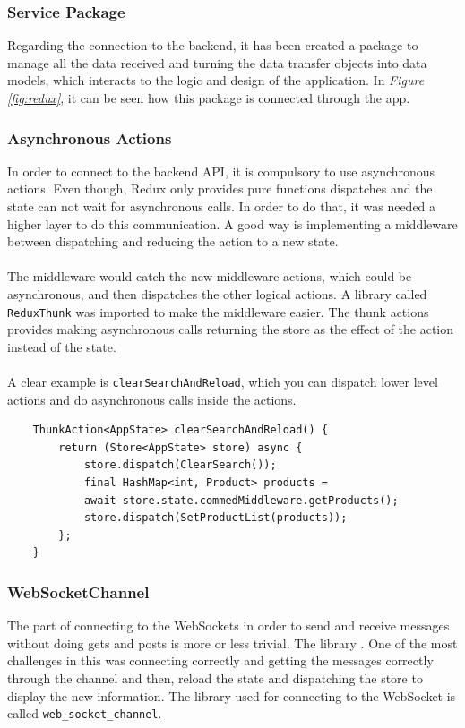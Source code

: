 \documentclass[./main.tex]{subfiles}
\begin{document}
	\subsubsection{Service Package}
	Regarding the connection to the backend, it has been created a package to manage all the data received and turning the data transfer objects into data models, which interacts to the logic and design of the application. In \textit{Figure \ref{fig:redux}}, it can be seen how this package is connected through the app.
	\subsubsection{Asynchronous Actions}
	In order to connect to the backend API, it is compulsory to use asynchronous actions. Even though, Redux only provides pure functions dispatches and the state can not wait for asynchronous calls. In order to do that, it was needed a higher layer to do this communication. A good way is implementing a middleware between dispatching and reducing the action to a new state.
	\\
	\\
	The middleware would catch the new middleware actions, which could be asynchronous, and then dispatches the other logical actions. A library called \texttt{ReduxThunk} was imported to make the middleware easier. The thunk actions provides making asynchronous calls returning the store as the effect of the action instead of the state.
	\\
	\\
	A clear example is \texttt{clearSearchAndReload}, which you can dispatch lower level actions and do asynchronous calls inside the actions.
	\begin{verbatim}
	ThunkAction<AppState> clearSearchAndReload() {
	    return (Store<AppState> store) async {
	        store.dispatch(ClearSearch());
	        final HashMap<int, Product> products =
	        await store.state.commedMiddleware.getProducts();
	        store.dispatch(SetProductList(products));
	    };
	}
	\end{verbatim}
	\subsubsection{WebSocketChannel}
	The part of connecting to the WebSockets in order to send and receive messages without doing gets and posts is more or less trivial. The library \texttt{}. One of the most challenges in this was connecting correctly and getting the messages correctly through the channel and then, reload the state and dispatching the store to display the new information. The library used for connecting to the WebSocket is called \texttt{web\_socket\_channel}.
	
\end{document}
